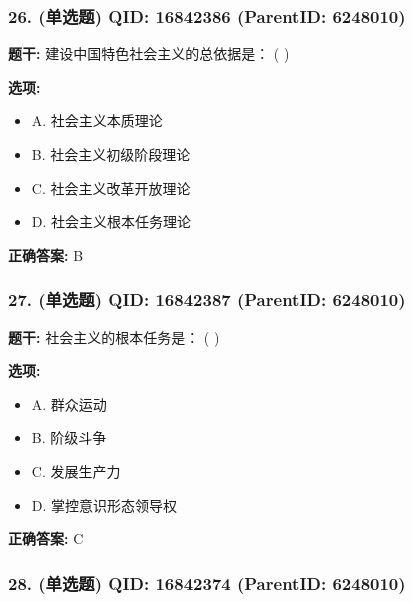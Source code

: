 \documentclass[12pt,UTF8]{ctexart}
\begin{document}
\subsubsection*{26. (单选题) \small QID: 16842386 (ParentID: 6248010)}

\textbf{题干:}
建设中国特色社会主义的总依据是： ( )



\textbf{选项:}
\begin{itemize}[leftmargin=*]

  \item A. 社会主义本质理论

  \item B. 社会主义初级阶段理论

  \item C. 社会主义改革开放理论

  \item D. 社会主义根本任务理论

\end{itemize}

\textbf{正确答案:}
B

\vspace{0.3em}\hrulefill\vspace{0.7em}

\subsubsection*{27. (单选题) \small QID: 16842387 (ParentID: 6248010)}

\textbf{题干:}
社会主义的根本任务是： ( )



\textbf{选项:}
\begin{itemize}[leftmargin=*]

  \item A. 群众运动

  \item B. 阶级斗争

  \item C. 发展生产力

  \item D. 掌控意识形态领导权

\end{itemize}

\textbf{正确答案:}
C

\vspace{0.3em}\hrulefill\vspace{0.7em}

\subsubsection*{28. (单选题) \small QID: 16842374 (ParentID: 6248010)}
\end{document}
